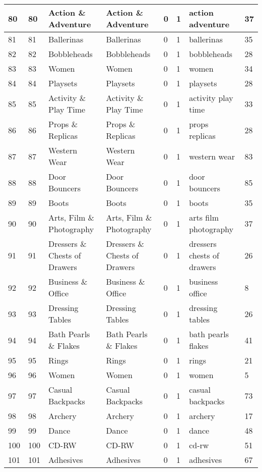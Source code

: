 \begin{longtable}{|l|l|l|l|l|l|l|l|}
80 & 80 & Action \& Adventure & Action \& Adventure & 0 & 1 & action adventure & 37 \\ \hline 
81 & 81 & Ballerinas & Ballerinas & 0 & 1 & ballerinas & 35 \\ \hline 
82 & 82 & Bobbleheads & Bobbleheads & 0 & 1 & bobbleheads & 28 \\ \hline 
83 & 83 & Women & Women & 0 & 1 & women & 34 \\ \hline 
84 & 84 & Playsets & Playsets & 0 & 1 & playsets & 28 \\ \hline 
85 & 85 & Activity \& Play Time & Activity \& Play Time & 0 & 1 & activity play time & 33 \\ \hline 
86 & 86 & Props \& Replicas & Props \& Replicas & 0 & 1 & props replicas & 28 \\ \hline 
87 & 87 & Western Wear & Western Wear & 0 & 1 & western wear & 83 \\ \hline 
88 & 88 & Door Bouncers & Door Bouncers & 0 & 1 & door bouncers & 85 \\ \hline 
89 & 89 & Boots & Boots & 0 & 1 & boots & 35 \\ \hline 
90 & 90 & Arts, Film \& Photography & Arts, Film \& Photography & 0 & 1 & arts film photography & 37 \\ \hline 
91 & 91 & Dressers \& Chests of Drawers & Dressers \& Chests of Drawers & 0 & 1 & dressers chests of drawers & 26 \\ \hline 
92 & 92 & Business \& Office & Business \& Office & 0 & 1 & business office & 8 \\ \hline 
93 & 93 & Dressing Tables & Dressing Tables & 0 & 1 & dressing tables & 26 \\ \hline 
94 & 94 & Bath Pearls \& Flakes & Bath Pearls \& Flakes & 0 & 1 & bath pearls flakes & 41 \\ \hline 
95 & 95 & Rings & Rings & 0 & 1 & rings & 21 \\ \hline 
96 & 96 & Women & Women & 0 & 1 & women & 5 \\ \hline 
97 & 97 & Casual Backpacks & Casual Backpacks & 0 & 1 & casual backpacks & 73 \\ \hline 
98 & 98 & Archery & Archery & 0 & 1 & archery & 17 \\ \hline 
99 & 99 & Dance & Dance & 0 & 1 & dance & 48 \\ \hline 
100 & 100 & CD-RW & CD-RW & 0 & 1 & cd-rw & 51 \\ \hline 
101 & 101 & Adhesives & Adhesives & 0 & 1 & adhesives & 67 \\ \hline 

\end{longtable}
